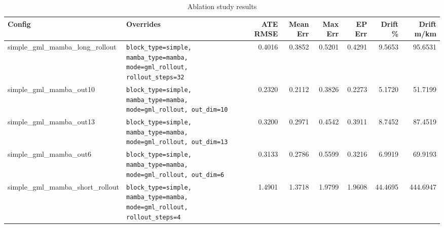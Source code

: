 \begin{table}[ht]
\centering
\caption{Ablation study results}
\label{tab:ablation}
\small
\setlength{\tabcolsep}{4pt}
\begin{tabular}{ll rr rr rr}
\toprule
\textbf{Config} & \textbf{Overrides} &
\textbf{ATE RMSE} & \textbf{Mean Err} &
\textbf{Max Err} & \textbf{EP Err} &
\textbf{Drift \%} & \textbf{Drift m/km} \\
\midrule
simple\_gml\_mamba\_long\_rollout & \texttt{block\_type=simple, mamba\_type=mamba, mode=gml\_rollout, rollout\_steps=32} & 0.4016 & 0.3852 & 0.5201 & 0.4291 & 9.5653 & 95.6531 \\
simple\_gml\_mamba\_out10 & \texttt{block\_type=simple, mamba\_type=mamba, mode=gml\_rollout, out\_dim=10} & 0.2320 & 0.2112 & 0.3826 & 0.2273 & 5.1720 & 51.7199 \\
simple\_gml\_mamba\_out13 & \texttt{block\_type=simple, mamba\_type=mamba, mode=gml\_rollout, out\_dim=13} & 0.3200 & 0.2971 & 0.4542 & 0.3911 & 8.7452 & 87.4519 \\
simple\_gml\_mamba\_out6 & \texttt{block\_type=simple, mamba\_type=mamba, mode=gml\_rollout, out\_dim=6} & 0.3133 & 0.2786 & 0.5599 & 0.3216 & 6.9919 & 69.9193 \\
simple\_gml\_mamba\_short\_rollout & \texttt{block\_type=simple, mamba\_type=mamba, mode=gml\_rollout, rollout\_steps=4} & 1.4901 & 1.3718 & 1.9799 & 1.9608 & 44.4695 & 444.6947 \\
\bottomrule
\end{tabular}
\end{table}
